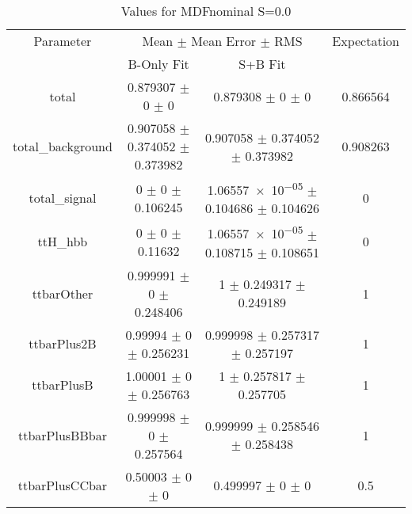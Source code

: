 \begin{table}
\centering
\caption{Values for MDFnominal S=0.0}
\begin{tabular}{cccc}
\toprule
Parameter & \multicolumn{2}{c}{Mean $\pm$ Mean Error $\pm$ RMS} & Expectation\\
 & B-Only Fit & S+B Fit & \\
\midrule
total & \num{0.879307} $\pm$ \num{0} $\pm$ \num{0} & \num{0.879308} $\pm$ \num{0} $\pm$ \num{0} & \num{0.866564}\\
total\_background & \num{0.907058} $\pm$ \num{0.374052} $\pm$ \num{0.373982} & \num{0.907058} $\pm$ \num{0.374052} $\pm$ \num{0.373982} & \num{0.908263}\\
total\_signal & \num{0} $\pm$ \num{0} $\pm$ \num{0.106245} & \num{1.06557e-05} $\pm$ \num{0.104686} $\pm$ \num{0.104626} & \num{0}\\
ttH\_hbb & \num{0} $\pm$ \num{0} $\pm$ \num{0.11632} & \num{1.06557e-05} $\pm$ \num{0.108715} $\pm$ \num{0.108651} & \num{0}\\
ttbarOther & \num{0.999991} $\pm$ \num{0} $\pm$ \num{0.248406} & \num{1} $\pm$ \num{0.249317} $\pm$ \num{0.249189} & \num{1}\\
ttbarPlus2B & \num{0.99994} $\pm$ \num{0} $\pm$ \num{0.256231} & \num{0.999998} $\pm$ \num{0.257317} $\pm$ \num{0.257197} & \num{1}\\
ttbarPlusB & \num{1.00001} $\pm$ \num{0} $\pm$ \num{0.256763} & \num{1} $\pm$ \num{0.257817} $\pm$ \num{0.257705} & \num{1}\\
ttbarPlusBBbar & \num{0.999998} $\pm$ \num{0} $\pm$ \num{0.257564} & \num{0.999999} $\pm$ \num{0.258546} $\pm$ \num{0.258438} & \num{1}\\
ttbarPlusCCbar & \num{0.50003} $\pm$ \num{0} $\pm$ \num{0} & \num{0.499997} $\pm$ \num{0} $\pm$ \num{0} & \num{0.5}\\
\bottomrule
\end{tabular}
\end{table}